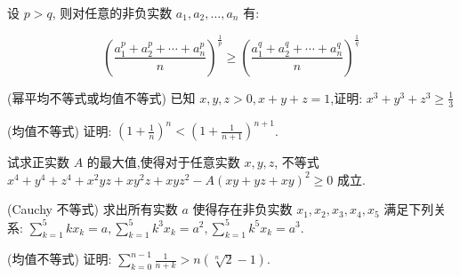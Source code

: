 \documentclass[a4paper , final]{ctexart}
\newenvironment{problem}[1]{%
  \item #1
  \par
  \vspace{8cm}
}{}
\begin{document}
设 $p>q$, 则对任意的非负实数 $a_1,a_2,\ldots,a_n$ 有:

\begin{equation*}
  \left(\frac{a_1^p+a_2^p+\cdots+a_n^p}{n}\right)^{\frac{1}{p}} \geq \left(\frac{a_1^q+a_2^q+\cdots+a_n^q}{n}\right)^{\frac{1}{q}}
\end{equation*}

\begin{problems}
  \begin{problem}
    {(幂平均不等式或均值不等式)
      已知 $x,y,z>0,x+y+z=1$,证明: $x^3+y^3+z^3\geq \frac{1}{3}$
    }
  \end{problem}

  \begin{problem}
    {(均值不等式)
      证明: $\left(1+\frac{1}{n}\right)^n < \left(1+\frac{1}{n+1}\right)^{n+1}$.
    }
  \end{problem}

  \begin{problem}
    {
      试求正实数 $A$ 的最大值,使得对于任意实数 $x,y,z$, 不等式 $x^4+y^4+z^4+x^2yz+xy^2z+xyz^2-A(xy+yz+xy)^2\ge 0$ 成立.
    }
  \end{problem}

  \begin{problem}
    {(Cauchy 不等式)
      求出所有实数 $a$ 使得存在非负实数 $x_1,x_2,x_3,x_4,x_5$ 满足下列关系: $\sum_{k=1}^5 kx_k=a,\sum_{k=1}^5 k^3x_k =a^2,\sum_{k=1}^5 k^5x_k =a^3$.
    }
  \end{problem}

  \begin{problem}
    {(均值不等式)
      证明: $\sum_{k=0}^{n-1} \frac{1}{n+k}>n(\sqrt[n]{2}-1)$.
    }
  \end{problem}
\end{problems}
\end{document}
